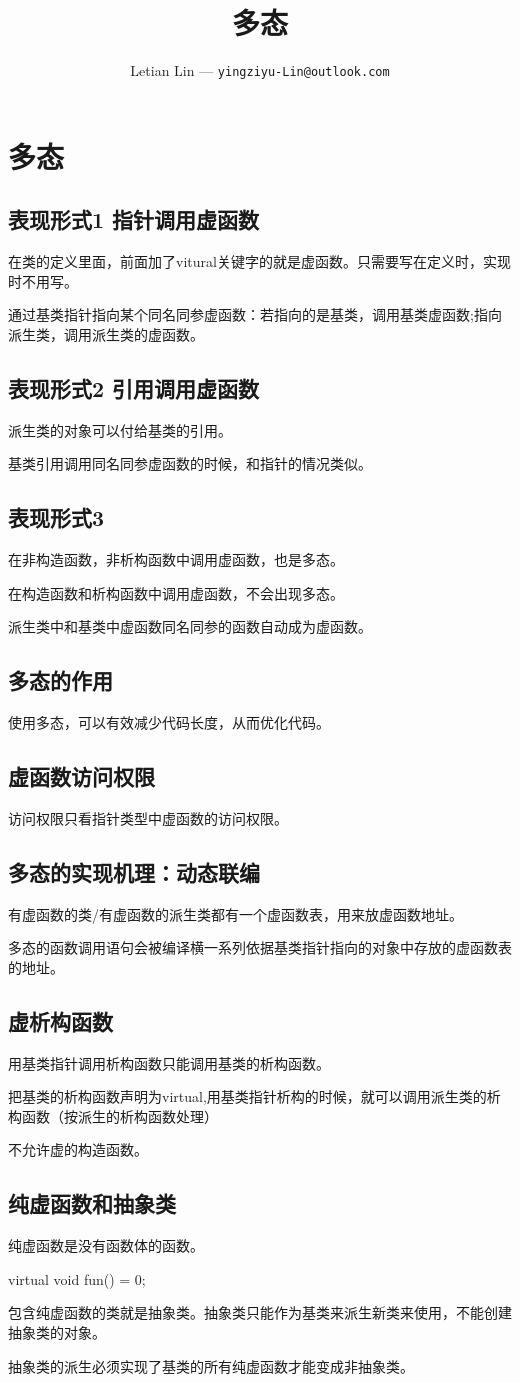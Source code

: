 \documentclass[UTF8]{ctexart}
\title{
	多态
}
\author{
	Letian Lin --- \texttt{yingziyu-Lin@outlook.com}
}
\begin{document}
\maketitle
\section{多态}
\subsection{表现形式1 指针调用虚函数}
在类的定义里面，前面加了vitural关键字的就是虚函数。只需要写在定义时，实现时不用写。

通过基类指针指向某个同名同参虚函数：若指向的是基类，调用基类虚函数;指向派生类，调用派生类的虚函数。

\subsection{表现形式2 引用调用虚函数}
派生类的对象可以付给基类的引用。

基类引用调用同名同参虚函数的时候，和指针的情况类似。

\subsection{表现形式3}
在非构造函数，非析构函数中调用虚函数，也是多态。

在构造函数和析构函数中调用虚函数，不会出现多态。

派生类中和基类中虚函数同名同参的函数自动成为虚函数。
\subsection{多态的作用}
使用多态，可以有效减少代码长度，从而优化代码。
\subsection{虚函数访问权限}
访问权限只看指针类型中虚函数的访问权限。
\subsection{多态的实现机理：动态联编}
有虚函数的类/有虚函数的派生类都有一个虚函数表，用来放虚函数地址。

多态的函数调用语句会被编译横一系列依据基类指针指向的对象中存放的虚函数表的地址。
\subsection{虚析构函数}
用基类指针调用析构函数只能调用基类的析构函数。

把基类的析构函数声明为virtual,用基类指针析构的时候，就可以调用派生类的析构函数（按派生的析构函数处理）

不允许虚的构造函数。
\subsection{纯虚函数和抽象类}
纯虚函数是没有函数体的函数。

virtual void fun() = 0;

包含纯虚函数的类就是抽象类。抽象类只能作为基类来派生新类来使用，不能创建抽象类的对象。

抽象类的派生必须实现了基类的所有纯虚函数才能变成非抽象类。
\end{document}
